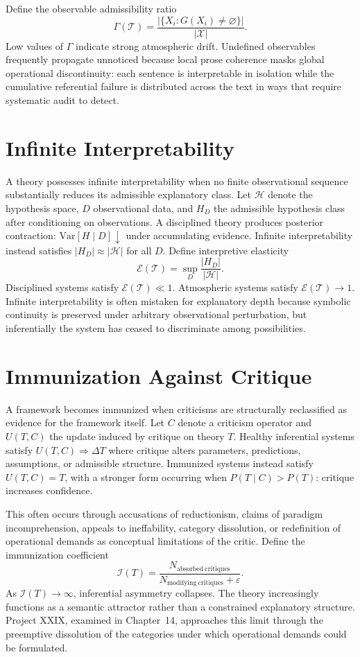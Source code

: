 \documentclass[12pt, openright, twoside]{book}
\begin{document}
Define the observable admissibility ratio
\[
\Gamma(\mathcal{T})
= \frac{|\{X_i : G(X_i) \neq \varnothing\}|}{|\mathcal{X}|}.
\]
Low values of $\Gamma$ indicate strong atmospheric drift. Undefined
observables frequently propagate unnoticed because local prose coherence
masks global operational discontinuity: each sentence is interpretable in
isolation while the cumulative referential failure is distributed across
the text in ways that require systematic audit to detect.

\section{Infinite Interpretability}

A theory possesses infinite interpretability when no finite observational
sequence substantially reduces its admissible explanatory class. Let
$\mathcal{H}$ denote the hypothesis space, $D$ observational data, and
$H_D$ the admissible hypothesis class after conditioning on observations.
A disciplined theory produces posterior contraction:
$\mathrm{Var}[H \mid D] \downarrow$ under accumulating evidence. Infinite
interpretability instead satisfies $|H_D| \approx |\mathcal{H}|$ for all
$D$. Define interpretive elasticity
\[
\mathcal{E}(\mathcal{T})
= \sup_D \frac{|H_D|}{|\mathcal{H}|}.
\]
Disciplined systems satisfy $\mathcal{E}(\mathcal{T}) \ll 1$. Atmospheric
systems satisfy $\mathcal{E}(\mathcal{T}) \to 1$. Infinite interpretability
is often mistaken for explanatory depth because symbolic continuity is
preserved under arbitrary observational perturbation, but inferentially
the system has ceased to discriminate among possibilities.

\section{Immunization Against Critique}

A framework becomes immunized when criticisms are structurally reclassified
as evidence for the framework itself. Let $C$ denote a criticism operator
and $U(T, C)$ the update induced by critique on theory $T$. Healthy
inferential systems satisfy $U(T, C) \Rightarrow \Delta T$ where critique
alters parameters, predictions, assumptions, or admissible structure.
Immunized systems instead satisfy $U(T, C) = T$, with a stronger form
occurring when $P(T \mid C) > P(T)$: critique increases confidence.

This often occurs through accusations of reductionism, claims of paradigm
incomprehension, appeals to ineffability, category dissolution, or
redefinition of operational demands as conceptual limitations of the
critic. Define the immunization coefficient
\[
\mathcal{I}(T)
= \frac{N_{\mathrm{absorbed\ critiques}}}
       {N_{\mathrm{modifying\ critiques}} + \varepsilon}.
\]
As $\mathcal{I}(T) \to \infty$, inferential asymmetry collapses. The theory
increasingly functions as a semantic attractor rather than a constrained
explanatory structure. Project XXIX, examined in Chapter~14, approaches
this limit through the preemptive dissolution of the categories under which
operational demands could be formulated.
\end{document}
